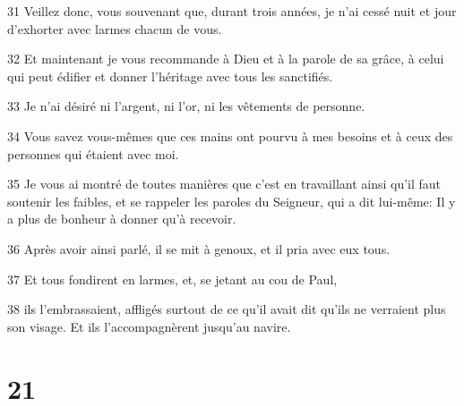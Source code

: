 \par 31 Veillez donc, vous souvenant que, durant trois années, je n'ai cessé nuit et jour d'exhorter avec larmes chacun de vous.
\par 32 Et maintenant je vous recommande à Dieu et à la parole de sa grâce, à celui qui peut édifier et donner l'héritage avec tous les sanctifiés.
\par 33 Je n'ai désiré ni l'argent, ni l'or, ni les vêtements de personne.
\par 34 Vous savez vous-mêmes que ces mains ont pourvu à mes besoins et à ceux des personnes qui étaient avec moi.
\par 35 Je vous ai montré de toutes manières que c'est en travaillant ainsi qu'il faut soutenir les faibles, et se rappeler les paroles du Seigneur, qui a dit lui-même: Il y a plus de bonheur à donner qu'à recevoir.
\par 36 Après avoir ainsi parlé, il se mit à genoux, et il pria avec eux tous.
\par 37 Et tous fondirent en larmes, et, se jetant au cou de Paul,
\par 38 ils l'embrassaient, affligés surtout de ce qu'il avait dit qu'ils ne verraient plus son visage. Et ils l'accompagnèrent jusqu'au navire.

\chapter{21}

